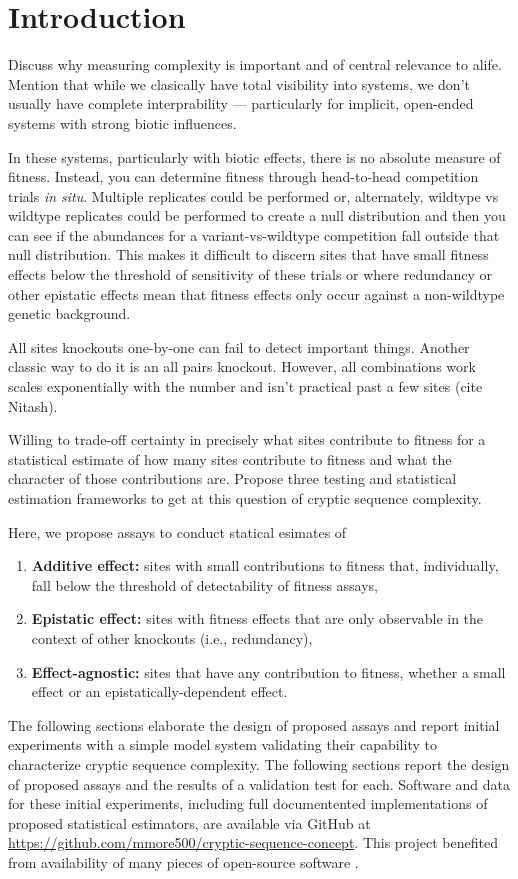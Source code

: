 \section{Introduction} \label{sec:introduction}

Discuss why measuring complexity is important and of central relevance to alife.
Mention that while we clasically have total visibility into systems, we don't usually have complete interprability --- particularly for implicit, open-ended systems with strong biotic influences.

In these systems, particularly with biotic effects, there is no absolute measure of fitness.
Instead, you can determine fitness through head-to-head competition trials \textit{in situ}.
Multiple replicates could be performed or, alternately, wildtype vs wildtype replicates could be performed to create a null distribution and then you can see if the abundances for a variant-vs-wildtype competition fall outside that null distribution.
This makes it difficult to discern sites that have small fitness effects below the threshold of sensitivity of these trials or where redundancy or other epistatic effects mean that fitness effects only occur against a non-wildtype genetic background.

All sites knockouts one-by-one can fail to detect important things.
Another classic way to do it is an all pairs knockout.
However, all combinations work scales exponentially with the number and isn't practical past a few sites (cite Nitash).

Willing to trade-off certainty in precisely what sites contribute to fitness for a statistical estimate of how many sites contribute to fitness and what the character of those contributions are.
Propose three testing and statistical estimation frameworks to get at this question of cryptic sequence complexity.

Here, we propose assays to conduct statical esimates of
\begin{enumerate}
\item \textbf{Additive effect:} sites with small contributions to fitness that, individually, fall below the threshold of detectability of fitness assays,
\item \textbf{Epistatic effect:} sites with fitness effects that are only observable in the context of other knockouts (i.e., redundancy),
\item \textbf{Effect-agnostic:} sites that have any contribution to fitness, whether a small effect or an epistatically-dependent effect.
\end{enumerate}

The following sections elaborate the design of proposed assays and report initial experiments with a simple model system validating their capability to characterize cryptic sequence complexity.
The following sections report the design of proposed assays and the results of a validation test for each.
Software and data for these initial experiments, including full documentented implementations of proposed statistical estimators, are available via GitHub at \url{https://github.com/mmore500/cryptic-sequence-concept}.
This project benefited from availability of many pieces of open-source software \citep{TODO}.
